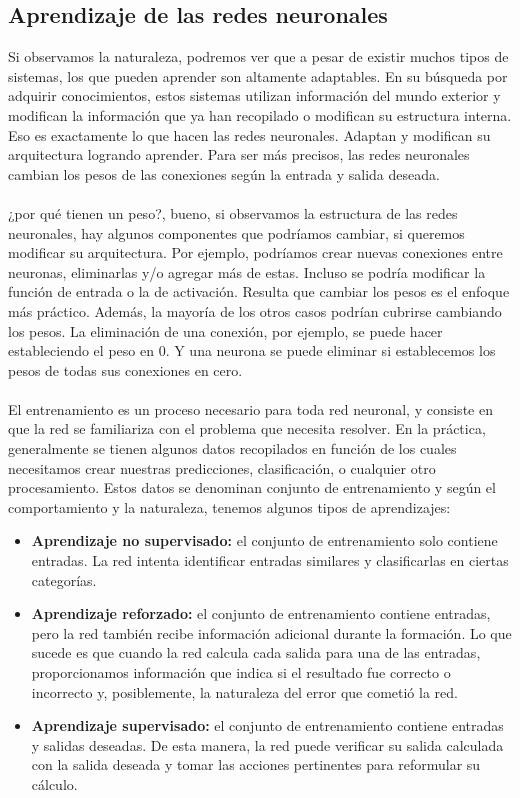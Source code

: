 \documentclass[12pt, a4paper, titlepage]{report}
\begin{document}
				\subsection{Aprendizaje de las redes neuronales}
				Si observamos la naturaleza, podremos ver que a pesar de existir muchos tipos de sistemas, los que  pueden aprender son altamente adaptables. En su búsqueda por adquirir conocimientos, estos sistemas utilizan información del mundo exterior y modifican la información que ya han recopilado o modifican su estructura interna. Eso es exactamente lo que hacen las redes neuronales. Adaptan y modifican su arquitectura logrando aprender. Para ser más precisos, las redes neuronales cambian los pesos de las conexiones según la entrada y salida deseada.\\\\
				¿por qué tienen un peso?, bueno, si observamos la estructura de las redes neuronales, hay algunos componentes que podríamos cambiar, si queremos modificar su arquitectura. Por ejemplo, podríamos crear nuevas conexiones entre neuronas, eliminarlas y/o agregar más de estas. Incluso se podría modificar la función de entrada o la de activación. Resulta que cambiar los pesos es el enfoque más práctico. Además, la mayoría de los otros casos podrían cubrirse cambiando los pesos. La eliminación de una conexión, por ejemplo, se puede hacer estableciendo el peso en 0. Y una neurona se puede eliminar si establecemos los pesos de todas sus conexiones en cero.\cite{refAprendizajeRedes}\\\\
				El entrenamiento es un proceso necesario para toda red neuronal, y consiste en que la red se familiariza con el problema que necesita resolver. En la práctica, generalmente se tienen algunos datos recopilados en función de los cuales necesitamos crear nuestras predicciones, clasificación, o cualquier otro procesamiento. Estos datos se denominan conjunto de entrenamiento y según el comportamiento y la naturaleza, tenemos algunos tipos de aprendizajes:\\
				\begin{itemize}
					\item \textbf{Aprendizaje no supervisado: }el conjunto de entrenamiento solo contiene entradas. La red intenta identificar entradas similares y clasificarlas en ciertas categorías.
					\item \textbf{Aprendizaje reforzado: }el conjunto de entrenamiento contiene entradas, pero la red también recibe información adicional durante la formación. Lo que sucede es que cuando la red calcula cada salida para una de las entradas, proporcionamos información que indica si el resultado fue correcto o incorrecto y, posiblemente, la naturaleza del error que cometió la red.
					\item \textbf{Aprendizaje supervisado: }el conjunto de entrenamiento contiene entradas y salidas deseadas. De esta manera, la red puede verificar su salida calculada con la salida deseada y tomar las acciones pertinentes para reformular su cálculo.
				\end{itemize}
\end{document}
